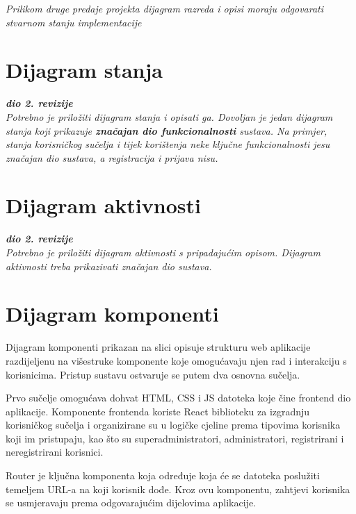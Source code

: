 			\textit{Prilikom druge predaje projekta dijagram razreda i opisi moraju odgovarati stvarnom stanju implementacije}
			
			
			
			\eject
		
		\section{Dijagram stanja}
			
			
			\textbf{\textit{dio 2. revizije}}\\
			
			\textit{Potrebno je priložiti dijagram stanja i opisati ga. Dovoljan je jedan dijagram stanja koji prikazuje \textbf{značajan dio funkcionalnosti} sustava. Na primjer, stanja korisničkog sučelja i tijek korištenja neke ključne funkcionalnosti jesu značajan dio sustava, a registracija i prijava nisu. }
			
			
			\eject 
		
		\section{Dijagram aktivnosti}
			
			\textbf{\textit{dio 2. revizije}}\\
			
			 \textit{Potrebno je priložiti dijagram aktivnosti s pripadajućim opisom. Dijagram aktivnosti treba prikazivati značajan dio sustava.}
			
			\eject
		\section{Dijagram komponenti}
		
			 Dijagram komponenti prikazan na slici opisuje strukturu web aplikacije razdijeljenu na višestruke komponente koje omogućavaju njen rad i interakciju s korisnicima. Pristup sustavu ostvaruje se putem dva osnovna sučelja.
			 
			 Prvo sučelje omogućava dohvat HTML, CSS i JS datoteka koje čine frontend dio aplikacije. Komponente frontenda koriste React biblioteku za izgradnju korisničkog sučelja i organizirane su u logičke cjeline prema tipovima korisnika koji im pristupaju, kao što su superadministratori, administratori, registrirani i neregistrirani korisnici.
			 
			 Router je ključna komponenta koja određuje koja će se datoteka poslužiti temeljem URL-a na koji korisnik dođe. Kroz ovu komponentu, zahtjevi korisnika se usmjeravaju prema odgovarajućim dijelovima aplikacije.
			 
